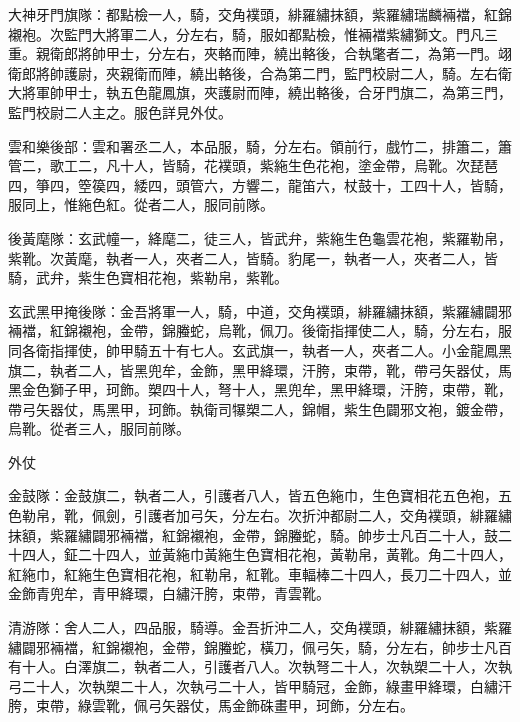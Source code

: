 \begin{pinyinscope}
 大神牙門旗隊：都點檢一人，騎，交角襆頭，緋羅繡抹額，紫羅繡瑞麟裲襠，紅錦襯袍。次監門大將軍二人，分左右，騎，服如都點檢，惟裲襠紫繡獅文。門凡三重。親衛郎將帥甲士，分左右，夾輅而陣，繞出輅後，合執氅者二，為第一門。翊衛郎將帥護尉，夾親衛而陣，繞出輅後，合為第二門，監門校尉二人，騎。左右衛大將軍帥甲士，執五色龍鳳旗，夾護尉而陣，繞出輅後，合牙門旗二，為第三門，監門校尉二人主之。服色詳見外仗。



 雲和樂後部：雲和署丞二人，本品服，騎，分左右。領前行，戲竹二，排簫二，簫管二，歌工二，凡十人，皆騎，花襆頭，紫絁生色花袍，塗金帶，烏靴。次琵琶四，箏四，箜篌四，緌四，頭管六，方響二，龍笛六，杖鼓十，工四十人，皆騎，服同上，惟絁色紅。從者二人，服同前隊。



 後黃麾隊：玄武幢一，絳麾二，徒三人，皆武弁，紫絁生色龜雲花袍，紫羅勒帛，紫靴。次黃麾，執者一人，夾者二人，皆騎。豹尾一，執者一人，夾者二人，皆騎，武弁，紫生色寶相花袍，紫勒帛，紫靴。



 玄武黑甲掩後隊：金吾將軍一人，騎，中道，交角襆頭，緋羅繡抹額，紫羅繡闢邪裲襠，紅錦襯袍，金帶，錦螣蛇，烏靴，佩刀。後衛指揮使二人，騎，分左右，服同各衛指揮使，帥甲騎五十有七人。玄武旗一，執者一人，夾者二人。小金龍鳳黑旗二，執者二人，皆黑兜牟，金飾，黑甲絳環，汗胯，束帶，靴，帶弓矢器仗，馬黑金色獅子甲，珂飾。槊四十人，弩十人，黑兜牟，黑甲絳環，汗胯，束帶，靴，帶弓矢器仗，馬黑甲，珂飾。執衛司犦槊二人，錦帽，紫生色闢邪文袍，鍍金帶，烏靴。從者三人，服同前隊。



 外仗



 金鼓隊：金鼓旗二，執者二人，引護者八人，皆五色絁巾，生色寶相花五色袍，五色勒帛，靴，佩劍，引護者加弓矢，分左右。次折沖都尉二人，交角襆頭，緋羅繡抹額，紫羅繡闢邪裲襠，紅錦襯袍，金帶，錦螣蛇，騎。帥步士凡百二十人，鼓二十四人，鉦二十四人，並黃絁巾黃絁生色寶相花袍，黃勒帛，黃靴。角二十四人，紅絁巾，紅絁生色寶相花袍，紅勒帛，紅靴。車輻棒二十四人，長刀二十四人，並金飾青兜牟，青甲絳環，白繡汗胯，束帶，青雲靴。



 清游隊：舍人二人，四品服，騎導。金吾折沖二人，交角襆頭，緋羅繡抹額，紫羅繡闢邪裲襠，紅錦襯袍，金帶，錦螣蛇，橫刀，佩弓矢，騎，分左右，帥步士凡百有十人。白澤旗二，執者二人，引護者八人。次執弩二十人，次執槊二十人，次執弓二十人，次執槊二十人，次執弓二十人，皆甲騎冠，金飾，綠畫甲絳環，白繡汗胯，束帶，綠雲靴，佩弓矢器仗，馬金飾硃畫甲，珂飾，分左右。




\end{pinyinscope}
